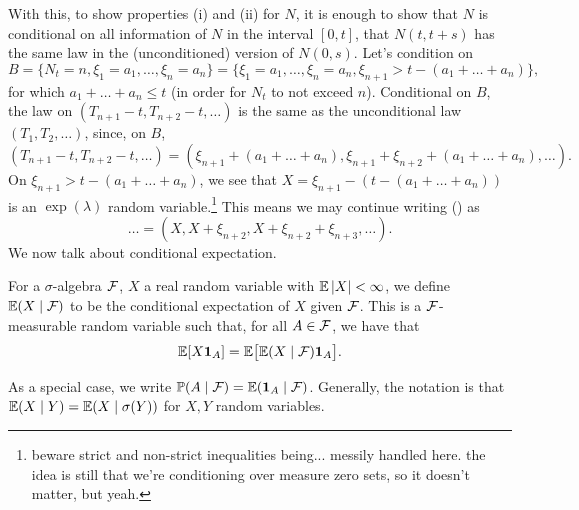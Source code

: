 With this, to show properties (i) and (ii) for $N$, it is enough to show that $N$ is conditional on all information of $N$ in the interval $[0, t]$, that $N(t, t+s)$ has the same law in the (unconditioned) version of $N(0, s)$. Let's condition on
\[ B = \{N_t = n, \xi_1 = a_1, \dots, \xi_n = a_n\} = \{\xi_1 = a_1, \dots, \xi_n = a_n, \xi_{n+1} > t - (a_1 + \dots + a_n)\}, \]
for which $a_1 + \dots + a_n \leq t$ (in order for $N_t$ to not exceed $n$). Conditional on $B$, the law on $(T_{n+1} - t, T_{n+2} - t, \dots)$ is the same as the unconditional law $(T_1, T_2, \dots)$, since, on $B$,
\[ (T_{n+1} - t, T_{n+2} - t, \dots) = (\xi_{n+1} + (a_1 + \dots + a_n), \xi_{n+1} + \xi_{n+2} + (a_1 + \dots + a_n), \dots). \tag{\textdagger} \]
On $\xi_{n+1} > t - (a_1 + \dots + a_n)$, we see that $X = \xi_{n+1} - (t - (a_1 + \dots + a_n))$ is an $\exp(\lambda)$ random variable.\footnote{beware strict and non-strict inequalities being... messily handled here. the idea is still that we're conditioning over measure zero sets, so it doesn't matter, but yeah.} This means we may continue writing (\textdagger) as
\[ \dots = (X, X + \xi_{n+2}, X + \xi_{n+2} + \xi_{n+3}, \dots). \]
We now talk about conditional expectation.
\begin{definition} \label{defn:conditional_expectation} 
    For a $\sigma$-algebra $\mathcal F$, $X$ a real random variable with $\mathbb E \left\lvert X \right\rvert < \infty$, we define $\mathbb E(X \mid \mathcal F)$ to be the conditional expectation of $X$ given $\mathcal F$. This is a $\mathcal F$-measurable random variable such that, for all $A \in \mathcal F$, we have that
    \[ \mathbb E [X \mathbf 1_A] = \mathbb E \bigl[\mathbb E(X \mid \mathcal F) \mathbf 1_A\bigr]. \]
\end{definition}

\newpage
As a special case, we write $\mathbb P(A \mid \mathcal F) = \mathbb E(\mathbf 1_A \mid \mathcal F)$. Generally, the notation is that $\mathbb E(X \mid Y) = \mathbb E(X \mid \sigma(Y))$ for $X, Y$ random variables.

